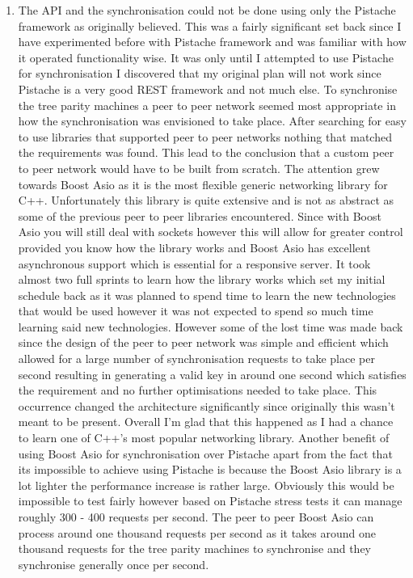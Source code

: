 \begin{enumerate}
\item The API and the synchronisation could not be done using only the Pistache framework as originally believed. This was a fairly significant set back since I have experimented before with Pistache framework and was familiar with how it operated functionality wise. It was only until I attempted to use Pistache for synchronisation I discovered that my original plan will not work since Pistache is a very good REST framework and not much else. To synchronise the tree parity machines a peer to peer network seemed most appropriate in how the synchronisation was envisioned to take place. After searching for easy to use libraries that supported peer to peer networks nothing that matched the requirements was found. This lead to the conclusion that a custom peer to peer network would have to be built from scratch. The attention grew towards Boost Asio as it is the most flexible generic networking library for C++. Unfortunately this library is quite extensive and is not as abstract as some of the previous peer to peer libraries encountered. Since with Boost Asio you will still deal with sockets however this will allow for greater control provided you know how the library works and Boost Asio has excellent asynchronous support which is essential for a responsive server. It took almost two full sprints to learn how the library works which set my initial schedule back as it was planned to spend time to learn the new technologies that would be used however it was not expected to spend so much time learning said new technologies. However some of the lost time was made back since the design of the peer to peer network was simple and efficient which allowed for a large number of synchronisation requests to take place per second resulting in generating a valid key in around one second which satisfies the requirement and no further optimisations needed to take place. This occurrence changed the architecture significantly since originally this wasn't meant to be present. Overall I'm glad that this happened as I had a chance to learn one of C++'s most popular networking library. Another benefit of using Boost Asio for synchronisation over Pistache apart from the fact that its impossible to achieve using Pistache is because the Boost Asio library is a lot lighter the performance increase is rather large. Obviously this would be impossible to test fairly however based on Pistache stress tests it can manage roughly 300 - 400 requests per second. The peer to peer Boost Asio can process around one thousand requests per second as it takes around one thousand requests for the tree parity machines to synchronise and they synchronise generally once per second.

\end{enumerate}


